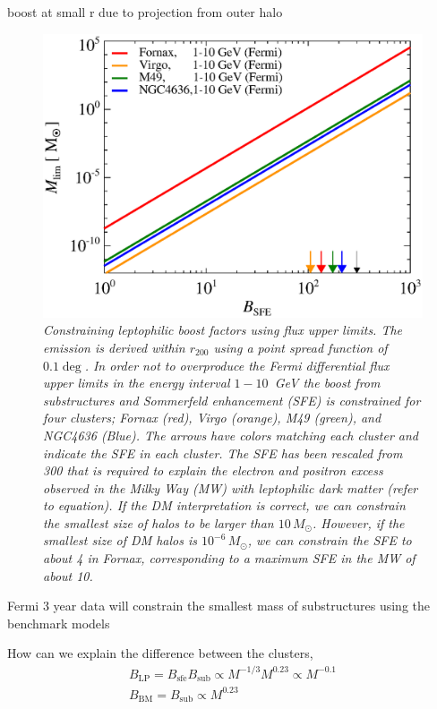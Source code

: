 \documentclass[10pt,aps,pra,reprint,amsmath,amsfonts,amssymb,showpacs]{revtex4-1}
\newcommand{\rmn}{\mathrm}
\newcommand{\sfe}{\rmn{sfe}}
\newcommand{\sub}{\rmn{sub}}
\newcommand{\msun}{M_\odot}
\newcommand{\rvir}{r_{200}}
\begin{document}
boost at small r due to projection from outer halo

\begin{figure}%
 \includegraphics[width=0.99\columnwidth]{figures/LP.const.diff.v9.0.1deg.1.6T.SubMass.SF300.IR2.noMW.woGal.eps}
\caption{\it Constraining leptophilic boost factors using flux upper
  limits. The emission is derived within $\rvir$ using a point spread
  function of $0.1\deg$. In order not to overproduce the Fermi
  differential flux upper limits in the energy interval $1-10$~GeV the
  boost from substructures and Sommerfeld enhancement (SFE) is
  constrained for four clusters; Fornax (red), Virgo (orange), M49
  (green), and NGC4636 (Blue). The arrows have colors matching each
  cluster and indicate the SFE in each cluster. The SFE has been
  rescaled from 300 that is required to explain the electron and
  positron excess observed in the Milky Way (MW) with leptophilic dark
  matter (refer to equation). If the DM interpretation is correct, we
  can constrain the smallest size of halos to be larger than
  $10\,\msun$. However, if the smallest size of DM halos is
  $10^{-6}\,\msun$, we can constrain the SFE to about 4 in Fornax,
  corresponding to a maximum SFE in the MW of about 10.}
 \label{fig10}
\end{figure}
 Fermi 3 year data will constrain the smallest mass of substructures
 using the benchmark models

How can we explain the difference between the clusters, 
\begin{eqnarray}
B_\rmn{LP}=B_\sfe B_\sub \propto M^{-1/3}M^{0.23} \propto M^{-0.1}\nonumber\\
B_\rmn{BM}=B_\sub \propto M^{0.23}
\end{eqnarray}
\end{document}
